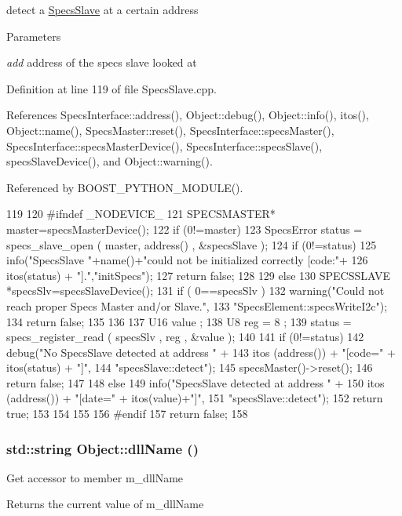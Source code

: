 detect a \hyperlink{classSpecsSlave}{SpecsSlave} at a certain address


\begin{DoxyParams}{Parameters}
\item[{\em add}]address of the specs slave looked at \end{DoxyParams}


Definition at line 119 of file SpecsSlave.cpp.

References SpecsInterface::address(), Object::debug(), Object::info(), itos(), Object::name(), SpecsMaster::reset(), SpecsInterface::specsMaster(), SpecsInterface::specsMasterDevice(), SpecsInterface::specsSlave(), specsSlaveDevice(), and Object::warning().

Referenced by BOOST\_\-PYTHON\_\-MODULE().


\begin{DoxyCode}
119                         {
120 #ifndef _NODEVICE_
121   SPECSMASTER* master=specsMasterDevice();
122   if (0!=master){
123     SpecsError status = specs_slave_open ( master, address() , &specsSlave );
124     if (0!=status){
125       info("SpecsSlave "+name()+"could not be initialized correctly [code:"+
126            itos(status) + "].","initSpecs");
127       return false;
128     }
129     else{
130       SPECSSLAVE *specsSlv=specsSlaveDevice();
131       if ( 0==specsSlv ){
132         warning("Could not reach proper Specs Master and/or Slave.",
133                 "SpecsElement::specsWriteI2c");
134         return false;
135       }
136       
137       U16 value ;
138       U8 reg = 8 ;
139       status = specs_register_read ( specsSlv , reg , &value );
140       
141       if (0!=status){
142         debug("No SpecsSlave detected at address " + 
143               itos (address()) + "[code=" + itos(status) + "]",
144               "specsSlave::detect");
145         specsMaster()->reset();
146         return false;
147       }
148       else {
149         info("SpecsSlave detected at address " + 
150              itos (address()) + "[date=" + itos(value)+"]",
151              "specsSlave::detect");
152         return true;
153       }
154     }    
155   }
156 #endif
157   return false;
158 }
\end{DoxyCode}
\hypertarget{classObject_a2e3947f2870094c332d7454117f3ec63}{
\subsubsection[{dllName}]{\setlength{\rightskip}{0pt plus 5cm}std::string Object::dllName ()}}
\label{classObject_a2e3947f2870094c332d7454117f3ec63}
Get accessor to member m\_\-dllName \begin{DoxyReturn}{Returns}
the current value of m\_\-dllName 
\end{DoxyReturn}


